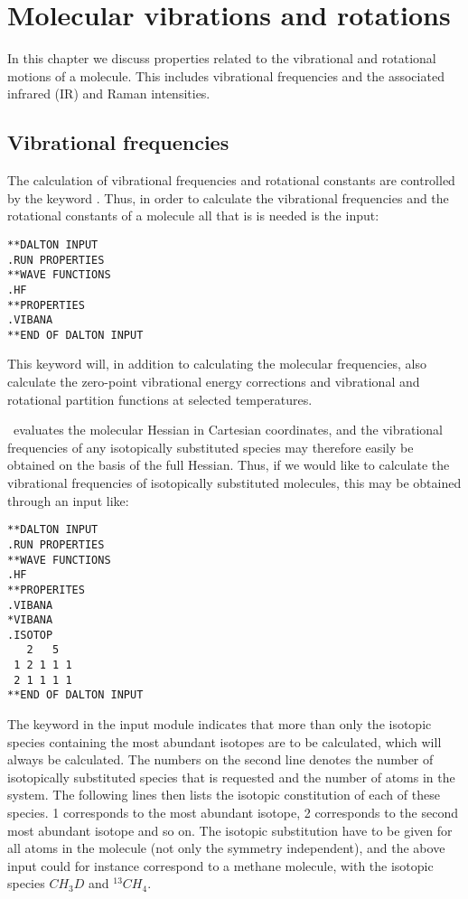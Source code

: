 \chapter{Molecular vibrations and rotations}\label{ch:vibrot}

In this chapter we discuss properties related  to the
vibrational and rotational motions of a molecule. This includes
vibrational frequencies and the associated infrared
(IR) and Raman intensities.

\section{Vibrational frequencies}\label{sec:vibfreq}

The calculation of vibrational frequencies and rotational constants are
controlled by the keyword . Thus, in order to
calculate the vibrational frequencies and the rotational constants
of a molecule all that is is needed is the input:

\begin{verbatim}
**DALTON INPUT
.RUN PROPERTIES
**WAVE FUNCTIONS
.HF
**PROPERTIES
.VIBANA
**END OF DALTON INPUT
\end{verbatim}

This keyword will, in addition to calculating the molecular
frequencies, also calculate the zero-point vibrational 
energy corrections and vibrational
and rotational partition functions
at selected temperatures.

\siraba\ evaluates the molecular Hessian in Cartesian
coordinates, and
the vibrational frequencies of any isotopically substituted  species
may therefore easily be obtained on the basis of the full
Hessian. Thus, if we would like to calculate the vibrational
frequencies of isotopically substituted molecules, this may be obtained through an input like:

\begin{verbatim}
**DALTON INPUT
.RUN PROPERTIES
**WAVE FUNCTIONS
.HF
**PROPERITES
.VIBANA
*VIBANA
.ISOTOP
   2   5
 1 2 1 1 1
 2 1 1 1 1
**END OF DALTON INPUT
\end{verbatim}

The keyword  in the  input module
indicates that more than only the isotopic species containing the most
abundant isotopes are to be calculated, which will always be
calculated. The numbers on the second line denotes the number of
isotopically substituted species that is requested and the number of
atoms in the system. The following lines then
lists the isotopic constitution of each of these species. 1
corresponds to the most abundant isotope, 2 corresponds to the second
most abundant isotope and so on. The isotopic substitution have to be
given for all atoms in the molecule (not only the symmetry
independent), and the above input could for instance correspond to a
methane molecule, with the isotopic species $CH_3D$
and $^{13}CH_4$.

